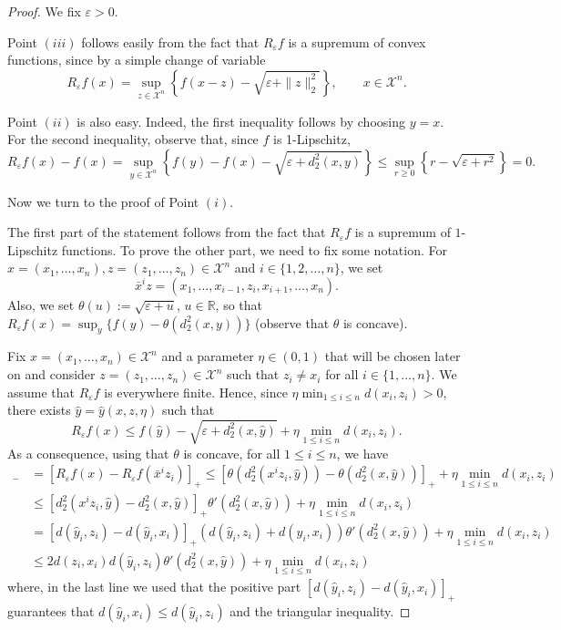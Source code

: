 \documentclass[11pt]{amsart}
\numberwithin{equation}{section}
\begin{document}
\begin{proof}We fix $\varepsilon>0.$

Point $(iii)$ follows easily from the fact that $R_\varepsilon f$ is a supremum of convex functions, since by a simple change of variable
\[
R_\varepsilon f(x)=\sup_{z\in {\mathcal{X}}^n}\left\{ f(x-z) -\sqrt{\varepsilon +\|z\|_2^2} \right\},\qquad x\in {\mathcal{X}}^n.
\]

Point $(ii)$ is also easy. Indeed, the first inequality follows  by choosing $y=x$. For the second inequality, observe that, since $f$ is 1-Lipschitz,
\[
R_\varepsilon f(x)-f(x)=\sup_{y\in {\mathcal{X}}^n}\left\{ f(y)-f(x) -\sqrt{\varepsilon +d_2^2(x,y)} \right\}\leq \sup_{r\geq 0}\left\{r -\sqrt{\varepsilon +r^2}\right\}=0.
\]

Now we turn to the proof of Point $(i)$. 

The first part of the statement follows from the fact that $R_\varepsilon f$ is a supremum of $1$-Lipschitz functions. To prove the other part, we need to fix some notation.
For $x=(x_1,\dots,x_n) , z=(z_1,\dots,z_n) \in {\mathcal{X}}^n$ and $i \in \{1,2,\ldots,n\}$, 
we set $$\bar{x}^iz=(x_1,\ldots,x_{i-1},z_i,x_{i+1},\ldots,x_n).$$
Also, we set $\theta(u):=\sqrt{\varepsilon+u}$, $u \in {\mathbb{R}}$, so that
$R_\varepsilon f(x)=\sup_y \{f(y)-\theta(d_2^2(x,y))\}$ (observe that $\theta$ is concave). 

Fix $x=(x_1,\dots,x_n) \in {\mathcal{X}}^n$ and a parameter  $\eta \in (0,1)$ that will be chosen later on and consider $z=(z_1,\ldots, z_n)\in {\mathcal{X}}^n$ such that $z_i\neq x_i$ for all $i\in\{1,\ldots,n\}$. We assume that $R_\varepsilon f$ is everywhere finite.
Hence, since $\eta\min_{1\leq i\leq n} d(x_i,z_i)>0$, 
there exists $\hat y=\hat y(x,z,\eta)$ such that 
\[
R_\varepsilon f(x) \leq  f(\hat y) -\sqrt{\varepsilon +d_2^2(x,\hat y)} 
+ \eta \min_{1\leq i\leq n} d(x_i,z_i). 
\]
As a consequence, using that $\theta$ is concave, for all $1\leq i\leq n$, we have
\begin{align*}
[R_\varepsilon f(\bar x^i z_i)-R_\varepsilon f(x)]_-
&=
[R_\varepsilon f(x)-R_\varepsilon f(\bar x^i z_i)]_+ 
\leq 
\left[\theta(d_2^2(x^i z_i,\hat y))-\theta(d_2^2(x,\hat y))\right]_+ 
+\eta\min_{1\leq i\leq n} d(x_i,z_i)\\
& \leq 
\left[d_2^2(x^i z_i,\hat y) - d_2^2(x,\hat y) \right]_+ \theta'(d_2^2(x,\hat y))
+\eta\min_{1\leq i\leq n} d(x_i,z_i)\\
& =
\left[d(\hat y_i,z_i)-d(\hat y_i,x_i)\right]_+\left(d(\hat y_i,z_i)+d(\hat y_i,x_i)\right)
\theta'(d_2^2(x,\hat y))
+\eta\min_{1\leq i\leq n} d(x_i,z_i) \\
&\leq
2 d(z_i,x_i) d(\hat y_i,z_i)
\theta'(d_2^2(x,\hat y))
+\eta\min_{1\leq i\leq n} d(x_i,z_i)
\end{align*}
where, in the last line we used that the positive part $\left[d(\hat y_i,z_i)-d(\hat y_i,x_i)\right]_+$ guarantees that $d(\hat y_i,x_i) \leq d(\hat y_i,z_i)$ and the triangular inequality.


\end{proof}
\end{document}

